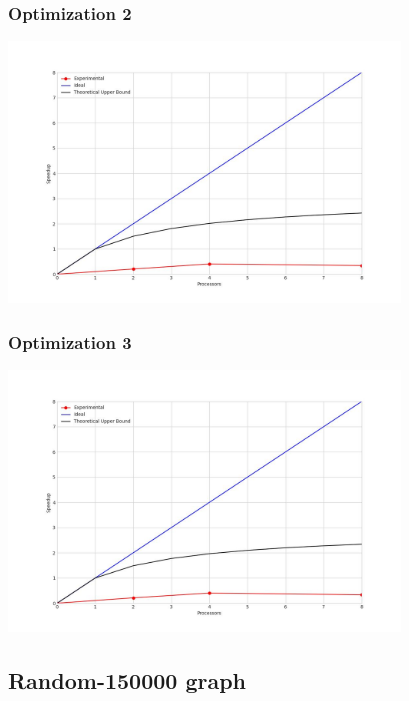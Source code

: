 \clearpage
\subsubsection{Optimization 2}
\begin{center}
    \resizebox{0.8\textwidth}{!}{}
    \includegraphics[width=0.78\textwidth]{../img/speedup-graph_type-fully-disconnected-1000000-O2}
\end{center}

\subsubsection{Optimization 3}
\begin{center}
    \resizebox{0.8\textwidth}{!}{}
    \includegraphics[width=0.78\textwidth]{../img/speedup-graph_type-fully-disconnected-1000000-O3}
\end{center}

\clearpage
\subsection{Random-150000 graph}
